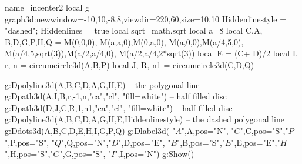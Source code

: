 \documentclass[border=5pt]{standalone}
\begin{document}
\begin{luadraw}{name=incenter2}
local g = graph3d:new{window={-10,10,-8,8},viewdir={220,60},size={10,10}}
Hiddenlinestyle = "dashed"; Hiddenlines = true
local sqrt=math.sqrt
local a=8
local  C,A, B,D,G,P,H,Q = M(0,0,0),  M(a,a,0),M(0,a,0), M(a,0,0),M(a/4,5,0), M(a/4,5,sqrt(3)),M(a/2,a/4,0), M(a/2,a/4,2*sqrt(3))
local E = (C+ D)/2
local I, r, n = circumcircle3d(A,B,P)
local J, R, n1 = circumcircle3d(C,D,Q)

g:Dpolyline3d({{A,B,C,D,A},{G,H,E}}) -- the polygonal line
g:Dpath3d({A,I,B,r,-1,n,"ca","cl"}, "fill=white") -- half filled disc
g:Dpath3d({D,J,C,R,1,n1,"ca","cl"}, "fill=white") -- half filled disc
g:Dpolyline3d({{A,B,C,D,A},{G,H,E}},Hiddenlinestyle) -- the dashed polygonal line
g:Ddots3d({A,B,C,D,E,H,I,G,P,Q})
g:Dlabel3d( "$A$",A,{pos="N"}, "$C$",C,{pos="S"},"$P$",P,{pos="S"}, "$Q$",Q,{pos="N"},"$D$",D,{pos="E"}, "$B$",B,{pos="S"},"$E$",E,{pos="E"},"$H$",H,{pos="S"},"$G$",G,{pos="S"}, "$I$",I,{pos="N"})
g:Show()
\end{luadraw}
\end{document}
